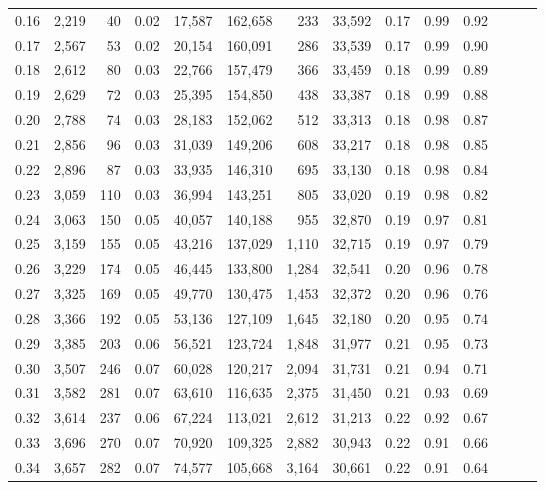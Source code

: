 \begin{tabular}{rrrrrrrrrrrrrr}
0.16 &  2,219 &   40 &  0.02 &   17,587 &  162,658 &     233 &  33,592 &  0.17 &  0.99 &      0.92 \\
0.17 &  2,567 &   53 &  0.02 &   20,154 &  160,091 &     286 &  33,539 &  0.17 &  0.99 &      0.90 \\
0.18 &  2,612 &   80 &  0.03 &   22,766 &  157,479 &     366 &  33,459 &  0.18 &  0.99 &      0.89 \\
0.19 &  2,629 &   72 &  0.03 &   25,395 &  154,850 &     438 &  33,387 &  0.18 &  0.99 &      0.88 \\
0.20 &  2,788 &   74 &  0.03 &   28,183 &  152,062 &     512 &  33,313 &  0.18 &  0.98 &      0.87 \\
0.21 &  2,856 &   96 &  0.03 &   31,039 &  149,206 &     608 &  33,217 &  0.18 &  0.98 &      0.85 \\
0.22 &  2,896 &   87 &  0.03 &   33,935 &  146,310 &     695 &  33,130 &  0.18 &  0.98 &      0.84 \\
0.23 &  3,059 &  110 &  0.03 &   36,994 &  143,251 &     805 &  33,020 &  0.19 &  0.98 &      0.82 \\
0.24 &  3,063 &  150 &  0.05 &   40,057 &  140,188 &     955 &  32,870 &  0.19 &  0.97 &      0.81 \\
0.25 &  3,159 &  155 &  0.05 &   43,216 &  137,029 &   1,110 &  32,715 &  0.19 &  0.97 &      0.79 \\
0.26 &  3,229 &  174 &  0.05 &   46,445 &  133,800 &   1,284 &  32,541 &  0.20 &  0.96 &      0.78 \\
0.27 &  3,325 &  169 &  0.05 &   49,770 &  130,475 &   1,453 &  32,372 &  0.20 &  0.96 &      0.76 \\
0.28 &  3,366 &  192 &  0.05 &   53,136 &  127,109 &   1,645 &  32,180 &  0.20 &  0.95 &      0.74 \\
0.29 &  3,385 &  203 &  0.06 &   56,521 &  123,724 &   1,848 &  31,977 &  0.21 &  0.95 &      0.73 \\
0.30 &  3,507 &  246 &  0.07 &   60,028 &  120,217 &   2,094 &  31,731 &  0.21 &  0.94 &      0.71 \\
0.31 &  3,582 &  281 &  0.07 &   63,610 &  116,635 &   2,375 &  31,450 &  0.21 &  0.93 &      0.69 \\
0.32 &  3,614 &  237 &  0.06 &   67,224 &  113,021 &   2,612 &  31,213 &  0.22 &  0.92 &      0.67 \\
0.33 &  3,696 &  270 &  0.07 &   70,920 &  109,325 &   2,882 &  30,943 &  0.22 &  0.91 &      0.66 \\
0.34 &  3,657 &  282 &  0.07 &   74,577 &  105,668 &   3,164 &  30,661 &  0.22 &  0.91 &      0.64 \\

\end{tabular}
